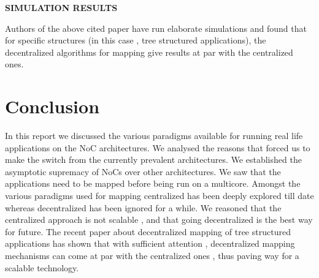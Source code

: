 \textbf{SIMULATION RESULTS}

Authors of the above cited paper have run elaborate simulations and
found that for specific structures (in this case , tree structured
applications), the decentralized algorithms for mapping give results
at par with the centralized ones.


\chapter{Conclusion}

In this report we discussed the various paradigms available for running
real life applications on the NoC architectures. We analysed the reasons
that forced us to make the switch from the currently prevalent architectures.
We established the asymptotic supremacy of NoCs over other architectures.
We saw that the applications need to be mapped before being run on
a multicore. Amongst the various paradigms used for mapping centralized
has been deeply explored till date whereas decentralized has been
ignored for a while. We reasoned that the centralized approach is
not scalable , and that going decentralized is the best way for future.
The recent paper about decentralized mapping of tree structured applications
has shown that with sufficient attention , decentralized mapping mechanisms
can come at par with the centralized ones , thus paving way for a
scalable technology.
